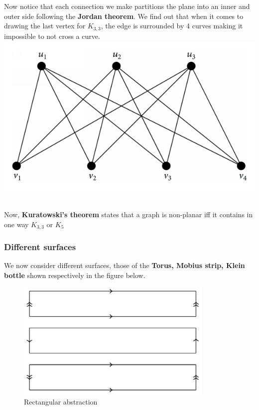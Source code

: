 \documentclass{article}
\theoremstyle{definition}
\numberwithin{equation}{subsection}
\numberwithin{remark}{subsection}
\begin{document}
 
 \begin{tcolorbox}[drop shadow, title=($K_{3,3}$ and $K_{5}$ are not planar),lower separated=true]
    Now notice that each connection we make partitions the plane into an inner and outer side following the \textbf{Jordan theorem}. We find out that when it comes to drawing the last vertex for $K_{3,3}$, the edge is surrounded by 4 curves making it impossible to not cross a curve. 
    \tcblower
    \centering
        \includegraphics[scale = 1.1,valign=t]{epflSemesterOne/advancedComputation/figures/k3.png}
\end{tcolorbox}
\\
Now, \textbf{Kuratowski's theorem} states that a graph is non-planar iff it contains in one way $K_{3,3}$ or $K_{5}$
\clearpage
\subsubsection{Different surfaces}
We now consider different surfaces, those of the \textbf{Torus, Mobius strip, Klein bottle} shown respectively in the figure below. 

\begin{figure}[H]
    \centering
    \includegraphics{epflSemesterOne/advancedComputation/figures/mobius.JPG}
    \caption{Rectangular abstraction}
\end{figure}
\end{document}
